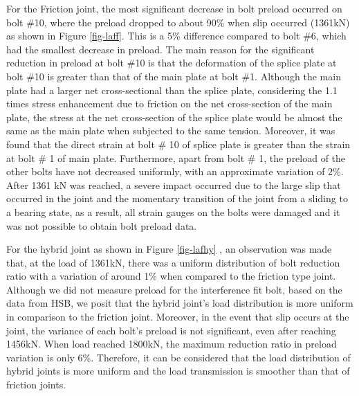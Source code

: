For the Friction joint, the most significant decrease in bolt preload occurred on bolt \#10, where the preload dropped to about 90\% when slip occurred (1361kN) as shown in Figure \ref{fig-laff}. This is a 5\% difference compared to bolt \#6, which had the smallest decrease in preload.  The main reason for the significant reduction in preload at bolt \#10 is that the deformation of the splice plate at bolt \#10 is greater than that of the main plate at bolt \#1. Although the main plate had a larger net cross-sectional than the splice plate, considering the 1.1 times stress enhancement due to friction on the net cross-section of the main plate, the stress at the net cross-section of the splice plate would be almost the same as the main plate when subjected to the same tension. Moreover, it was found that the direct strain at bolt \# 10 of splice plate is greater than the strain at bolt \# 1 of main plate. Furthermore, apart from bolt \# 1, the preload of the other bolts have not decreased uniformly, with an approximate variation of 2\%. After 1361 kN was reached, a severe impact occurred due to the large slip that occurred in the joint and the momentary transition of the joint from a sliding to a bearing state, as a result, all strain gauges on the bolts were damaged and it was not possible to obtain bolt preload data.

For the hybrid joint as shown in Figure \ref{fig-lafhy} , an observation was made that, at the load of 1361kN, there was a uniform distribution of bolt reduction ratio with a variation of around 1\% when compared to the friction type joint. Although we did not measure preload for the interference fit bolt, based on the data from HSB, we posit that the hybrid joint's load distribution is more uniform in comparison to the friction joint. Moreover, in the event that slip occurs at the joint, the variance of each bolt's preload is not significant, even after reaching 1456kN. When load reached 1800kN, the maximum reduction ratio in preload variation is only 6\%. Therefore, it can be considered that the load distribution of hybrid joints is more uniform and the load transmission is smoother than that of friction joints.

